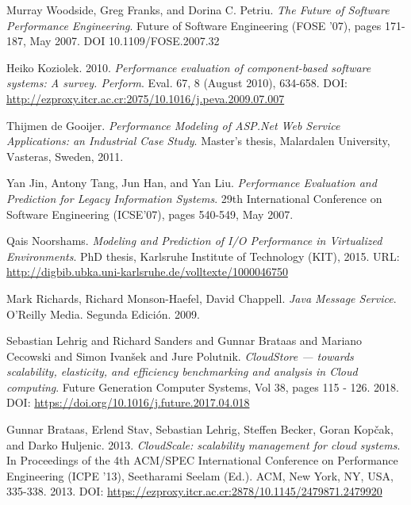 \documentclass[article]{IEEEtran}
\begin{document}
\begin{thebibliography}{00}
 Murray Woodside, Greg Franks, and Dorina C. Petriu. \emph{The Future of Software Performance Engineering}. Future of Software Engineering (FOSE '07), pages 171-187, May 2007. DOI 10.1109/FOSE.2007.32
 
 Heiko Koziolek. 2010. \emph{Performance evaluation of component-based software systems: A survey. Perform}. Eval. 67, 8 (August 2010), 634-658. DOI: \url{http://ezproxy.itcr.ac.cr:2075/10.1016/j.peva.2009.07.007}     

 Thijmen de Gooijer. \emph{Performance Modeling of ASP.Net Web
Service Applications: an Industrial Case Study}. Master's thesis, Malardalen University, Vasteras, Sweden, 2011.

 Yan Jin, Antony Tang, Jun Han, and Yan Liu. \emph{Performance Evaluation and Prediction for Legacy Information Systems}. 29th International Conference on Software Engineering (ICSE'07), pages 540-549, May 2007.

 Qais Noorshams. \emph{Modeling and Prediction of I/O Performance in Virtualized Environments}. PhD thesis, Karlsruhe Institute of Technology (KIT), 2015. URL: \url{http://digbib.ubka.uni-karlsruhe.de/volltexte/1000046750}

 Mark Richards, Richard Monson-Haefel, David Chappell. \emph{Java Message Service}. O'Reilly Media. Segunda Edición. 2009.

 Sebastian Lehrig and Richard Sanders and Gunnar Brataas and Mariano Cecowski and Simon Ivanšek and Jure Polutnik. \emph{CloudStore — towards scalability, elasticity, and efficiency benchmarking and analysis in Cloud computing}. Future Generation Computer Systems, Vol 38, pages 115 - 126. 2018. DOI: \url{https://doi.org/10.1016/j.future.2017.04.018} 

 Gunnar Brataas, Erlend Stav, Sebastian Lehrig, Steffen Becker, Goran Kopčak, and Darko Huljenic. 2013. \emph{CloudScale: scalability management for cloud systems}. In Proceedings of the 4th ACM/SPEC International Conference on Performance Engineering (ICPE '13), Seetharami Seelam (Ed.). ACM, New York, NY, USA, 335-338. 2013. DOI: \url{https://ezproxy.itcr.ac.cr:2878/10.1145/2479871.2479920}

\end{thebibliography}
\end{document}
